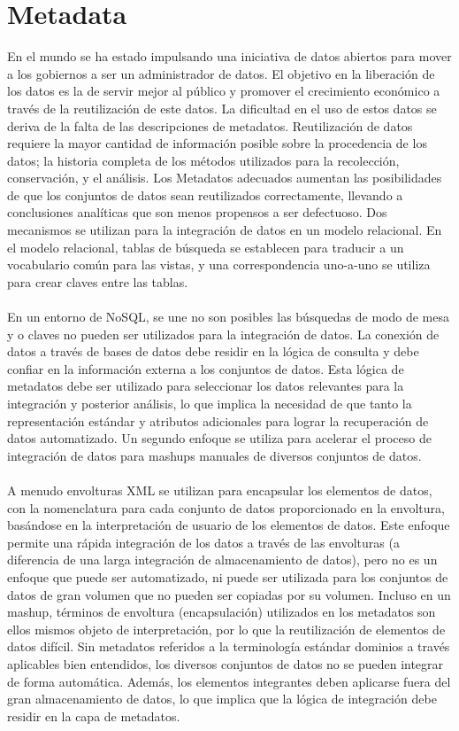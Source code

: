 \documentclass[journal]{IEEEtran}
\begin{document}
\section{Metadata}
En el mundo se ha estado impulsando una iniciativa de datos abiertos para mover a los gobiernos a ser un administrador de datos. El objetivo en la liberación de los datos es la de servir mejor al público y promover el crecimiento económico a través de la reutilización de este datos. La dificultad en el uso de estos datos se deriva de la falta de las descripciones de metadatos. Reutilización de datos requiere la mayor cantidad de información posible sobre la procedencia de los datos; la historia completa de los métodos utilizados para la recolección, conservación, y el análisis. Los Metadatos adecuados aumentan las posibilidades de que los conjuntos de datos sean reutilizados correctamente, llevando a conclusiones analíticas que son menos propensos a ser defectuoso. Dos mecanismos se utilizan para la integración de datos en un modelo relacional. En el modelo relacional, tablas de búsqueda se establecen para traducir a un vocabulario común para las vistas, y una correspondencia uno-a-uno se utiliza para crear claves entre las tablas.\\ \\
En un entorno de NoSQL, se une no son posibles las búsquedas de modo de mesa y o claves no pueden ser utilizados para la integración de datos. La conexión de datos a través de bases de datos debe residir en la lógica de consulta y debe confiar en la información externa a los conjuntos de datos. Esta lógica de metadatos debe ser utilizado para seleccionar los datos relevantes para la integración y posterior análisis, lo que implica la necesidad de que tanto la representación estándar y atributos adicionales para lograr la recuperación de datos automatizado. Un segundo enfoque se utiliza para acelerar el proceso de integración de datos para mashups manuales de diversos conjuntos de datos.\\ \\
A menudo envolturas XML se utilizan para encapsular los elementos de datos, con la nomenclatura para cada conjunto de datos proporcionado en la envoltura, basándose en la interpretación de usuario de los elementos de datos. Este enfoque permite una rápida integración de los datos a través de las envolturas (a diferencia de una larga integración de almacenamiento de datos), pero no es un enfoque que puede ser automatizado, ni puede ser utilizada para los conjuntos de datos de gran volumen que no pueden ser copiadas por su volumen. Incluso en un mashup, términos de envoltura (encapsulación) utilizados en los metadatos son ellos mismos objeto de interpretación, por lo que la reutilización de elementos de datos difícil. Sin metadatos referidos a la terminología estándar dominios a través aplicables bien entendidos, los diversos conjuntos de datos no se pueden integrar de forma automática. Además, los elementos integrantes deben aplicarse fuera del gran almacenamiento de datos, lo que implica que la lógica de integración debe residir en la capa de metadatos.
\end{document}
